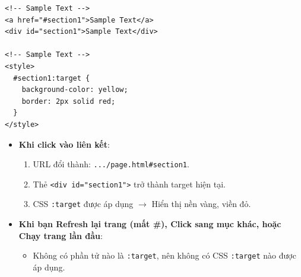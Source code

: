\documentclass[11pt,oneside]{book}
\newcommand{\thd}[1]{\textcolor{white}{\textbf{\strut #1}}}
\newcommand{\codeinline}[1]{\textcolor{accentOrange}{\texttt{#1}}}
\begin{document}
\begin{codeWindow}
\begin{lstlisting}[language=HTML5]
<!-- Sample Text -->
<a href="#section1">Sample Text</a>
<div id="section1">Sample Text</div>

<!-- Sample Text -->
<style>
  #section1:target {
    background-color: yellow;
    border: 2px solid red;
  }
</style>
\end{lstlisting}
\end{codeWindow}

\begin{browserWindow}
\sffamily\small
\begin{itemize}[leftmargin=1.5em, itemsep=3pt, parsep=0pt]
    \item \textbf{Khi click vào liên kết}:
    \begin{enumerate}[leftmargin=1.2em, itemsep=1pt]
        \item URL đổi thành: \codeinline{.../page.html\#section1}.
        \item Thẻ \codeinline{<div id="section1">} trở thành target hiện tại.
        \item CSS \codeinline{:target} được áp dụng $\rightarrow$ Hiển thị nền vàng, viền đỏ.
    \end{enumerate}
    \item \textbf{Khi bạn Refresh lại trang (mất \#), Click sang mục khác, hoặc Chạy trang lần đầu}:
    \begin{itemize}[leftmargin=1.2em, itemsep=1pt]
        \item Không có phần tử nào là \codeinline{:target}, nên không có CSS \codeinline{:target} nào được áp dụng.
    \end{itemize}
\end{itemize}
\end{browserWindow}

\begin{prettyTableBox}
\sffamily\small
{}
\end{prettyTableBox}
\end{document}
